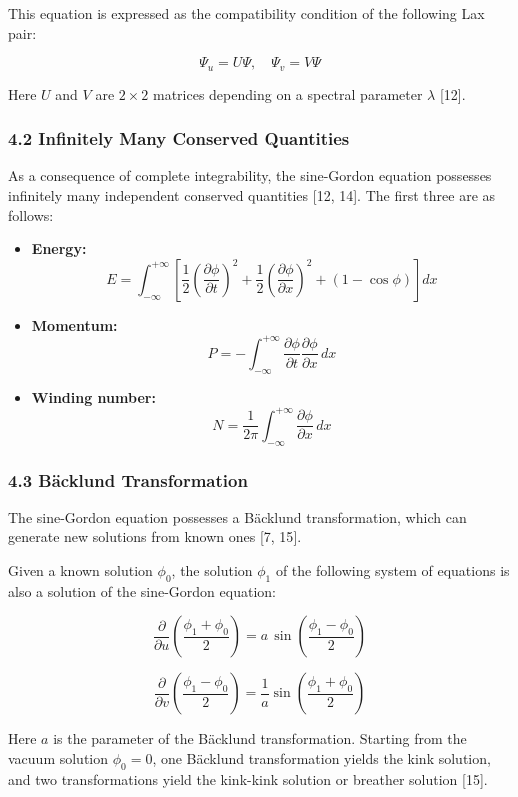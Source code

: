 \documentclass[a4paper,11pt]{article}
\begin{document}
This equation is expressed as the compatibility condition of the
following Lax pair:

\[\Psi_u = U\Psi, \quad \Psi_v = V\Psi\]

Here \(U\) and \(V\) are \(2 \times 2\) matrices depending on a spectral
parameter \(\lambda\) {[}12{]}.

\subsubsection{4.2 Infinitely Many Conserved
Quantities}\label{infinitely-many-conserved-quantities}

As a consequence of complete integrability, the sine-Gordon equation
possesses infinitely many independent conserved quantities {[}12, 14{]}.
The first three are as follows:

\begin{itemize}
\item
  \textbf{Energy:}
  \[E = \int_{-\infty}^{+\infty}\left[\frac{1}{2}\left(\frac{\partial\phi}{\partial t}\right)^2 + \frac{1}{2}\left(\frac{\partial\phi}{\partial x}\right)^2 + (1-\cos\phi)\right]dx\]
\item
  \textbf{Momentum:}
  \[P = -\int_{-\infty}^{+\infty}\frac{\partial\phi}{\partial t}\frac{\partial\phi}{\partial x}\,dx\]
\item
  \textbf{Winding number:}
  \[N = \frac{1}{2\pi}\int_{-\infty}^{+\infty}\frac{\partial\phi}{\partial x}\,dx\]
\end{itemize}

\subsubsection{4.3 Bäcklund
Transformation}\label{buxe4cklund-transformation}

The sine-Gordon equation possesses a Bäcklund transformation, which can
generate new solutions from known ones {[}7, 15{]}.

Given a known solution \(\phi_0\), the solution \(\phi_1\) of the
following system of equations is also a solution of the sine-Gordon
equation:

\[\frac{\partial}{\partial u}\left(\frac{\phi_1 + \phi_0}{2}\right) = a\,\sin\left(\frac{\phi_1 - \phi_0}{2}\right)\]

\[\frac{\partial}{\partial v}\left(\frac{\phi_1 - \phi_0}{2}\right) = \frac{1}{a}\sin\left(\frac{\phi_1 + \phi_0}{2}\right)\]

Here \(a\) is the parameter of the Bäcklund transformation. Starting
from the vacuum solution \(\phi_0 = 0\), one Bäcklund transformation
yields the kink solution, and two transformations yield the kink-kink
solution or breather solution {[}15{]}.
\end{document}
